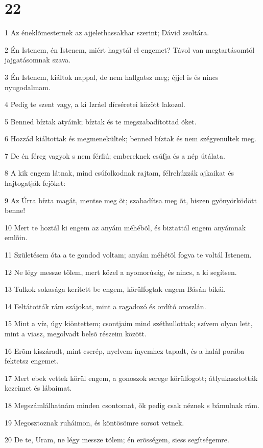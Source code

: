 \chapter{22}

\par 1 Az éneklõmesternek az ajjelethassakhar szerint; Dávid zsoltára.
\par 2 Én Istenem, én Istenem, miért hagytál el engemet? Távol van megtartásomtól jajgatásomnak szava.
\par 3 Én Istenem, kiáltok nappal, de nem hallgatsz meg; éjjel is és nincs nyugodalmam.
\par 4 Pedig te szent vagy, a ki Izráel dícséretei között lakozol.
\par 5 Benned bíztak atyáink; bíztak és te megszabadítottad õket.
\par 6 Hozzád kiáltottak és megmenekültek; benned bíztak és nem szégyenültek meg.
\par 7 De én féreg vagyok s nem férfiú; embereknek csúfja és a nép útálata.
\par 8 A kik engem látnak, mind csúfolkodnak rajtam, félrehúzzák ajkaikat és hajtogatják fejöket:
\par 9 Az Úrra bízta magát, mentse meg õt; szabadítsa meg õt, hiszen gyönyörködött benne!
\par 10 Mert te hoztál ki engem az anyám méhébõl, és biztattál engem anyámnak emlõin.
\par 11 Születésem óta a te gondod voltam; anyám méhétõl fogva te voltál Istenem.
\par 12 Ne légy messze tõlem, mert közel a nyomorúság, és nincs, a ki segítsen.
\par 13 Tulkok sokasága kerített be engem, körülfogtak engem Básán bikái.
\par 14 Feltátották rám szájokat, mint a ragadozó és ordító oroszlán.
\par 15 Mint a víz, úgy kiöntettem; csontjaim mind széthullottak; szívem olyan lett, mint a viasz, megolvadt belsõ részeim között.
\par 16 Erõm kiszáradt, mint cserép, nyelvem ínyemhez tapadt, és a halál porába fektetsz engemet.
\par 17 Mert ebek vettek körül engem, a gonoszok serege körülfogott; átlyukasztották kezeimet és lábaimat.
\par 18 Megszámlálhatnám minden csontomat, õk pedig csak néznek s bámulnak rám.
\par 19 Megosztoznak ruháimon, és köntösömre sorsot vetnek.
\par 20 De te, Uram, ne légy messze tõlem; én erõsségem, siess segítségemre.
